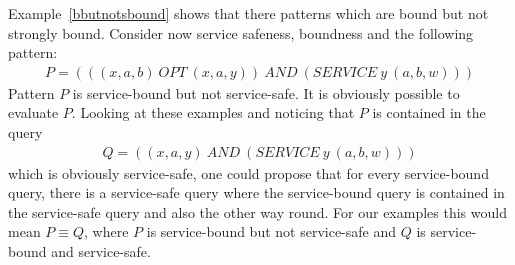 Example~\ref{bbutnotsbound} shows that there patterns 
which are bound but not strongly bound.
Consider now service safeness, boundness and the following pattern:
\begin{align*}
	P = (((x,a, b) \ OPT \ (x, a, y)) \  AND \ (SERVICE \ y \  (a,b,w)))
\end{align*}
Pattern $P$ is service-bound but not service-safe. It is obviously possible to
evaluate $P$. Looking at these examples and noticing that $P$ is contained in
the query 
\begin{align*}
	Q = ((x,a, y) \  AND \ (SERVICE \ y \ (a,b,w)))
\end{align*} which is obviously service-safe, one could propose that for every
service-bound query, there is a service-safe query where the service-bound query
is contained in the service-safe query and also the other way round. For our
examples this would mean $P \equiv Q$, where $P$ is service-bound but not
service-safe and $Q$ is service-bound and service-safe.

